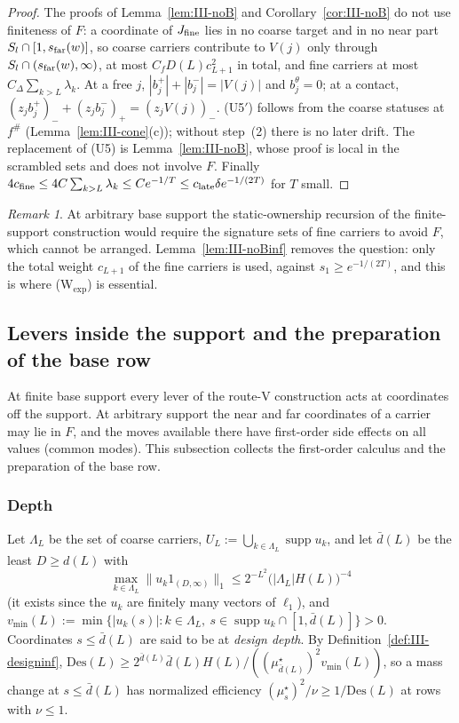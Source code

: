 \documentclass[10pt]{amsart}
\theoremstyle{definition}
\theoremstyle{remark}
\newtheorem{remark}[theorem]{Remark}
\newcommand{\supp}{\operatorname{supp}}
\begin{document}
\begin{proof}
The proofs of Lemma~\ref{lem:III-noB} and Corollary~\ref{cor:III-noB} do not
use finiteness of $F$: a coordinate of $J_{\rm fine}$ lies in no coarse target
and in no near part $S_l\cap[1,s_{\rm far}(w)]$, so coarse carriers contribute
to $V(j)$ only through $S_l\cap(s_{\rm far}(w),\infty)$, at most $C_f D(L)
c_{L+1}^2$ in total, and fine carriers at most $C_\Delta\sum_{k>L}\lambda_k$.
At a free $j$, $|b^+_j|+|b^-_j|=|V(j)|$ and $b^\theta_j=0$; at a contact,
$(z_jb^+_j)_-+(z_jb^-_j)_+=(z_jV(j))_-$.  (U5$'$) follows from the coarse
statuses at $f^\#$ (Lemma~\ref{lem:III-cone}(c)); without step~(2) there is no
later drift.  The replacement of (U5) is Lemma~\ref{lem:III-noB}, whose proof
is local in the scrambled sets and does not involve $F$.  Finally
$4c_{\rm fine}\le4C\sum_{k>L}\lambda_k\le Ce^{-1/T}\le c_{\rm late}\delta
e^{-1/(2T)}$ for $T$ small.
\end{proof}

\begin{remark}\label{rem:III-noB}
At arbitrary base support the static-ownership recursion of the finite-support
construction would require the signature sets of fine carriers to avoid $F$,
which cannot be arranged.  Lemma~\ref{lem:III-noBinf} removes the question: only
the total weight $c_{L+1}$ of the fine carriers is used, against $s_1\ge
e^{-1/(2T)}$, and this is where (W$_{\exp}$) is essential.
\end{remark}

\subsection{Levers inside the support and the preparation of the base row}
\label{subsec:III-levers}

At finite base support every lever of the route-V construction acts at
coordinates off the support.  At arbitrary support the near and far
coordinates of a carrier may lie in $F$, and the moves available there have
first-order side effects on all values (common modes).  This subsection
collects the first-order calculus and the preparation of the base row.

\subsubsection*{Depth}
Let $\Lambda_L$ be the set of coarse carriers, $U_L:=\bigcup_{k\in\Lambda_L}
\supp u_k$, and let $\bar d(L)$ be the least $D\ge d(L)$ with
\[
 \max_{k\in\Lambda_L}\|u_k1_{(D,\infty)}\|_1\le2^{-L^2}\big(|\Lambda_L|H(L)\big)^{-4}
\]
(it exists since the $u_k$ are finitely many vectors of $\ell_1$), and
$v_{\min}(L):=\min\{|u_k(s)|:k\in\Lambda_L,\ s\in\supp u_k\cap[1,\bar d(L)]\}>0$.
Coordinates $s\le\bar d(L)$ are said to be at \emph{design depth}.  By
Definition~\ref{def:III-designinf}, $\mathrm{Des}(L)\ge2^{\bar d(L)}\bar d(L)
H(L)/((\mu^\star_{\bar d(L)})^2v_{\min}(L))$, so a mass change at $s\le\bar d(L)$
has normalized efficiency $(\mu^\star_s)^2/\nu\ge1/\mathrm{Des}(L)$ at rows with
$\nu\le1$.
\end{document}
